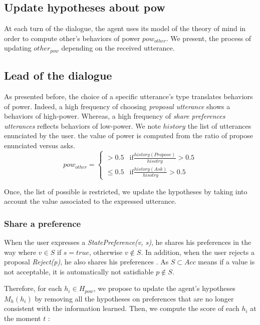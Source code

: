 \documentclass{llncs}
\begin{document}
	\subsection{Update hypotheses about pow}
		At each turn of the dialogue, the agent uses its model of the theory of mind in order to compute other's behaviors of power $pow_{other}$. We present, the process of updating $other_{pow}$ depending on the received utterance. 
				\subsection{Lead of the dialogue}		
				As presented before, the choice of a specific utterance's type translates behaviors of power. Indeed, a high frequency of choosing \emph{proposal utterance} shows a behaviors of high-power. Whereas, a high frequency of \emph{share preferences utterances} reflects behaviors of low-power.
				We note $history$ the list of utterances enunciated by the user. the value of power is computed from the ratio of propose enunciated versus asks.
				\begin{equation}
				pow_{other} = \left\{\begin{array}{ll}
				> 0.5 & \mathrm{if } \frac{history(Propose)}{hisotry} > 0.5\\
				\leq 0.5 & \mathrm{if  } \frac{history(Ask)}{hisotry} > 0.5
				\end{array}\right.
				\end{equation}
		
		Once, the list of possible is restricted, we update the hypotheses by taking into account the value associated to the expressed utterance.
		
		\subsubsection{Share a preference}
			When the user expresses a \emph{StatePreference(v, s)}, he shares his preferences in the way where $v \in S$ if $s =true$, otherwise $v \notin S$. 
			In addition, when the user rejects a proposal \emph{Reject(p)}, he also shares his preferences . As $S \subset Acc$ means if a value is not acceptable, it is automatically not satisfiable $p \notin S$. 
			
			Therefore, for each  $h_i \in H_{pow}$, we propose to update the agent's hypotheses $M_h(h_i)$ by removing all the hypotheses on preferences that are no longer consistent with the information learned. 
			Then, we compute the score of each $h_i$ at the moment $t$ :
	
\end{document}
